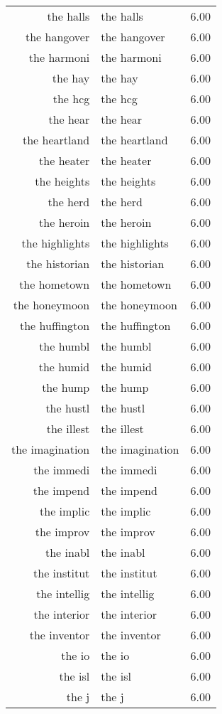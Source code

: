 \begin{table}[ht]
\begin{tabular}{rlr}
  the halls & the halls & 6.00 \\ 
  the hangover & the hangover & 6.00 \\ 
  the harmoni & the harmoni & 6.00 \\ 
  the hay & the hay & 6.00 \\ 
  the hcg & the hcg & 6.00 \\ 
  the hear & the hear & 6.00 \\ 
  the heartland & the heartland & 6.00 \\ 
  the heater & the heater & 6.00 \\ 
  the heights & the heights & 6.00 \\ 
  the herd & the herd & 6.00 \\ 
  the heroin & the heroin & 6.00 \\ 
  the highlights & the highlights & 6.00 \\ 
  the historian & the historian & 6.00 \\ 
  the hometown & the hometown & 6.00 \\ 
  the honeymoon & the honeymoon & 6.00 \\ 
  the huffington & the huffington & 6.00 \\ 
  the humbl & the humbl & 6.00 \\ 
  the humid & the humid & 6.00 \\ 
  the hump & the hump & 6.00 \\ 
  the hustl & the hustl & 6.00 \\ 
  the illest & the illest & 6.00 \\ 
  the imagination & the imagination & 6.00 \\ 
  the immedi & the immedi & 6.00 \\ 
  the impend & the impend & 6.00 \\ 
  the implic & the implic & 6.00 \\ 
  the improv & the improv & 6.00 \\ 
  the inabl & the inabl & 6.00 \\ 
  the institut & the institut & 6.00 \\ 
  the intellig & the intellig & 6.00 \\ 
  the interior & the interior & 6.00 \\ 
  the inventor & the inventor & 6.00 \\ 
  the io & the io & 6.00 \\ 
  the isl & the isl & 6.00 \\ 
  the j & the j & 6.00 \\ 

\end{tabular}
\end{table}
